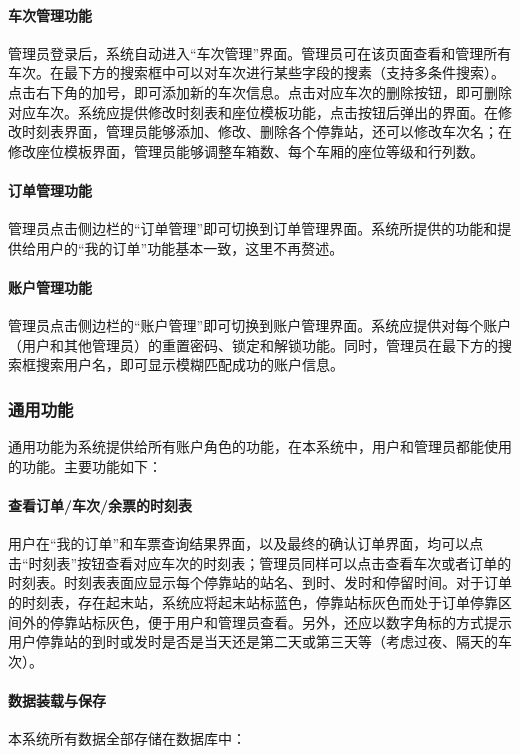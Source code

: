 \documentclass{article}
\begin{document}
	
	
	
	\paragraph{车次管理功能} 管理员登录后，系统自动进入“车次管理”界面。管理员可在该页面查看和管理所有车次。在最下方的搜索框中可以对车次进行某些字段的搜素（支持多条件搜索）。点击右下角的加号，即可添加新的车次信息。点击对应车次的删除按钮，即可删除对应车次。系统应提供修改时刻表和座位模板功能，点击按钮后弹出的界面。在修改时刻表界面，管理员能够添加、修改、删除各个停靠站，还可以修改车次名；在修改座位模板界面，管理员能够调整车箱数、每个车厢的座位等级和行列数。
	
	
	
	\paragraph{订单管理功能} 管理员点击侧边栏的“订单管理”即可切换到订单管理界面。系统所提供的功能和提供给用户的“我的订单”功能基本一致，这里不再赘述。
	
	
	\paragraph{账户管理功能} 管理员点击侧边栏的“账户管理”即可切换到账户管理界面。系统应提供对每个账户（用户和其他管理员）的重置密码、锁定和解锁功能。同时，管理员在最下方的搜索框搜索用户名，即可显示模糊匹配成功的账户信息。
	
	\subsubsection{通用功能}
	通用功能为系统提供给所有账户角色的功能，在本系统中，用户和管理员都能使用的功能。主要功能如下：
	
	
	\paragraph{查看订单/车次/余票的时刻表} 用户在“我的订单”和车票查询结果界面，以及最终的确认订单界面，均可以点击“时刻表”按钮查看对应车次的时刻表；管理员同样可以点击查看车次或者订单的时刻表。时刻表表面应显示每个停靠站的站名、到时、发时和停留时间。对于订单的时刻表，存在起末站，系统应将起末站标蓝色，停靠站标灰色而处于订单停靠区间外的停靠站标灰色，便于用户和管理员查看。另外，还应以数字角标的方式提示用户停靠站的到时或发时是否是当天还是第二天或第三天等（考虑过夜、隔天的车次）。
	
	
	
	\paragraph{数据装载与保存} 本系统所有数据全部存储在数据库中：
	
\end{document}

